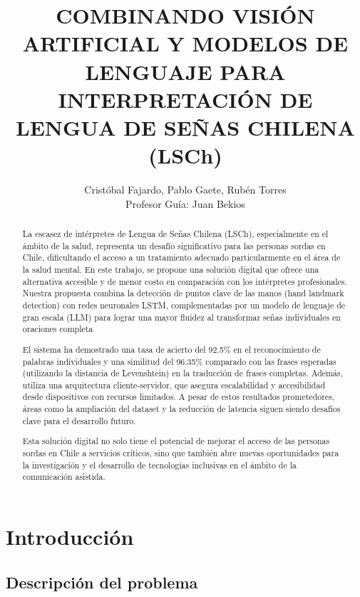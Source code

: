 \documentclass{article}
\begin{document}
\title{COMBINANDO VISIÓN ARTIFICIAL Y MODELOS DE LENGUAJE PARA INTERPRETACIÓN DE LENGUA DE SEÑAS CHILENA (LSCh)}

\author{Cristóbal Fajardo, Pablo Gaete, Rubén Torres \\ 
Profesor Guía: Juan Bekios}


\maketitle


\begin{abstract}

La escasez de intérpretes de Lengua de Señas Chilena (LSCh), especialmente en el ámbito de la salud, representa un desafío significativo para las personas sordas en Chile, dificultando el acceso a un tratamiento adecuado particularmente en el área de la salud mental. En este trabajo, se propone una solución digital que ofrece una alternativa accesible y de menor costo en comparación con los intérpretes profesionales. Nuestra propuesta combina la detección de puntos clave de las manos (hand landmark detection) con redes neuronales LSTM, complementadas por un modelo de lenguaje de gran escala (LLM) para lograr una mayor fluidez al transformar señas individuales en oraciones completa

El sistema ha demostrado una tasa de acierto del 92.5\% en el reconocimiento de palabras individuales y una similitud del 96.35\% comparado con las frases esperadas (utilizando la distancia de Levenshtein) en la traducción de frases completas. Además, utiliza una arquitectura cliente-servidor, que asegura escalabilidad y accesibilidad desde dispositivos con recursos limitados. A pesar de estos resultados prometedores, áreas como la ampliación del dataset y la reducción de latencia siguen siendo desafíos clave para el desarrollo futuro.

Esta solución digital no solo tiene el potencial de mejorar el acceso de las personas sordas en Chile a servicios críticos, sino que también abre nuevas oportunidades para la investigación y el desarrollo de tecnologías inclusivas en el ámbito de la comunicación asistida.

\end{abstract}

\section{Introducción}

\subsection{Descripción del problema}
\end{document}
